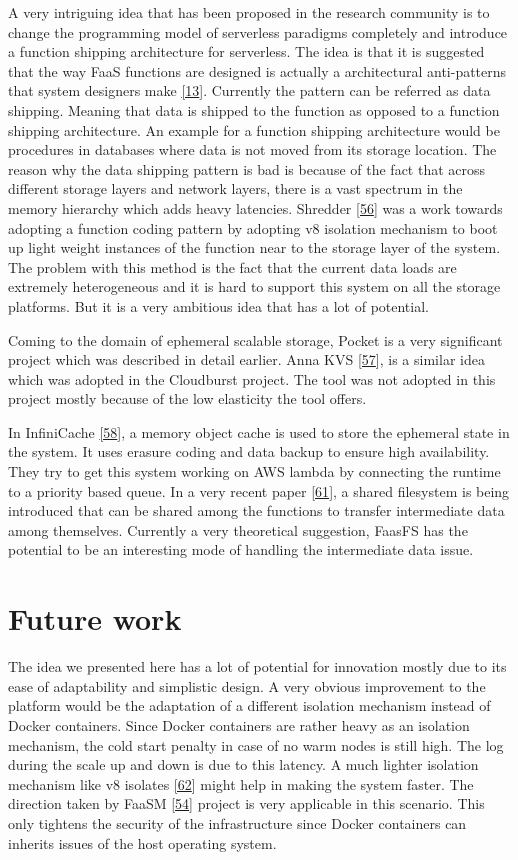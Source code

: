 \documentclass[12pt,titlepage]{article}
\begin{document}
A very intriguing idea that has been proposed in the research community is to
change the programming model of serverless paradigms completely and introduce a
function shipping architecture for serverless. The idea is that it is suggested
that the way FaaS functions are designed is actually a architectural
anti-patterns that system designers make \hyperref[ref:13]{[13}]. Currently the
pattern can be referred as data shipping. Meaning that data is shipped to the
function as opposed to a function shipping architecture. An example for a
function shipping architecture would be procedures in databases where data is
not moved from its storage location. The reason why the data shipping pattern is
bad is because of the fact that across different storage layers and network
layers, there is a vast spectrum in the memory hierarchy which adds heavy
latencies. Shredder \hyperref[ref:56]{[56}] was a work towards adopting a function
coding pattern by adopting v8 isolation mechanism to boot up light weight
instances of the function near to the storage layer of the system. The problem
with this method is the fact that the current data loads are extremely
heterogeneous and it is hard to support this system on all the storage
platforms. But it is a very ambitious idea that has a lot of potential.

Coming to the domain of ephemeral scalable storage, Pocket is a very significant
project which was described in detail earlier. Anna KVS \hyperref[ref:57]{[57}], is a
similar idea which was adopted in the Cloudburst project. The tool was not
adopted in this project mostly because of the low elasticity the tool offers.


In InfiniCache \hyperref[ref:58]{[58}], a memory object cache is used to store the ephemeral
state in the system. It uses erasure coding and data backup to ensure high availability.
They try to get this system working on AWS lambda by connecting the runtime to a
priority based queue. In a very recent paper \hyperref[ref:61]{[61}], a shared filesystem is being
introduced that can be shared among the functions to transfer intermediate data
among themselves. Currently a very theoretical suggestion, FaasFS has the
potential to be an interesting mode of handling the intermediate data issue.

\section{Future work}
\label{sec:org057f67e}
The idea we presented here has a lot of potential for innovation mostly due to
its ease of adaptability and simplistic design. A very obvious improvement to
the platform would be the adaptation of a different isolation mechanism instead
of Docker containers. Since Docker containers are rather heavy as an isolation
mechanism, the cold start penalty in case of no warm nodes is still high. The
log during the scale up and down is due to this latency. A much lighter
isolation mechanism like v8 isolates \hyperref[ref:62]{[62}] might help in making the system faster. The
direction taken by FaaSM \hyperref[ref:54]{[54}] project is very applicable in this scenario. This only
tightens the security of the infrastructure since Docker containers can inherits
issues of the host operating system.
\end{document}
